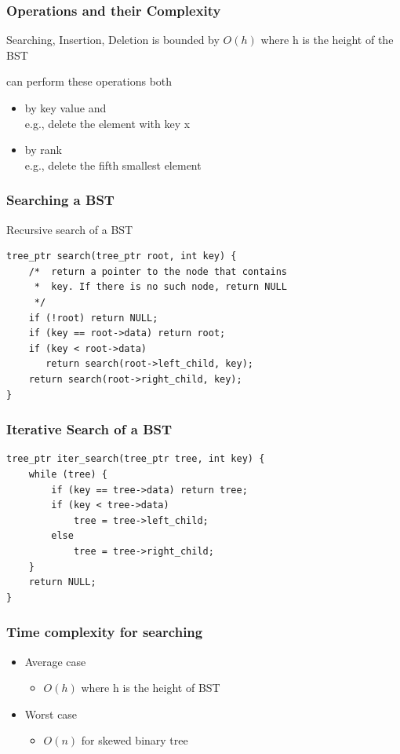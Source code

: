 \documentclass[newPxFont,sthlmFooter,nooffset]{beamer}
\begin{document}
\begin{frame}[t]
  \frametitle{Operations and their Complexity}
Searching, Insertion, Deletion is bounded by $O(h)$ where h is the height of the BST

can perform these operations both
\begin{itemize}
\item by key value and\\
      e.g., delete the element with key x
\item by rank\\
      e.g., delete the fifth smallest element
\end{itemize}
\end{frame}


\begin{frame}[t, fragile]
  \frametitle{Searching a BST}

Recursive search of a BST
  \begin{lstlisting}
tree_ptr search(tree_ptr root, int key) { 
    /*  return a pointer to the node that contains
     *  key. If there is no such node, return NULL 
     */
    if (!root) return NULL;
    if (key == root->data) return root; 
    if (key < root->data) 
       return search(root->left_child, key); 
    return search(root->right_child, key);    
}
  \end{lstlisting}
\end{frame}


\begin{frame}[t, fragile]
  \frametitle{Iterative Search of a BST}
  \begin{lstlisting}
tree_ptr iter_search(tree_ptr tree, int key) {
    while (tree) {
        if (key == tree->data) return tree; 
        if (key < tree->data)
            tree = tree->left_child; 
        else
            tree = tree->right_child; 
    }
    return NULL; 
}    
  \end{lstlisting}
\end{frame}


\begin{frame}[t]
  \frametitle{Time complexity for searching}
  \begin{itemize}
  \item Average case
    \begin{itemize}
    \item $O(h)$ where h is the height of BST
    \end{itemize}
  \item Worst case
    \begin{itemize}
    \item $O(n)$ for skewed binary tree
    \end{itemize}
  \end{itemize}
\end{frame}
\end{document}
